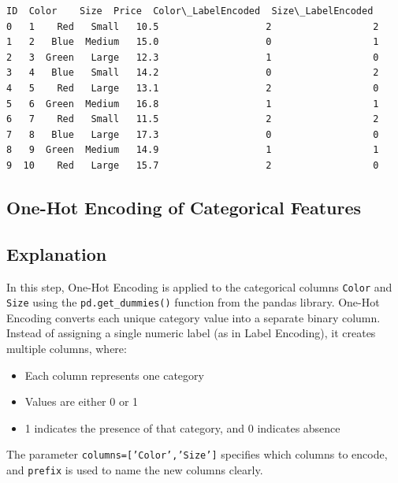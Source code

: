 \documentclass[11pt,a4paper]{report}
\makeatletter
\newcommand{\boxspacing}{\kern\kvtcb@left@rule\kern\kvtcb@boxsep}
\newcommand{\prompt}[4]{
        {\ttfamily\llap{{\color{#2}[#3]:\hspace{3pt}#4}}\vspace{-\baselineskip}}
    }
\makeatother
\begin{document}
            \begin{tcolorbox}[breakable, size=fbox, boxrule=.5pt, pad at break*=1mm, opacityfill=0]
\prompt{Out}{outcolor}{3}{\boxspacing}
\begin{Verbatim}[commandchars=\\\{\}]
   ID  Color    Size  Price  Color\_LabelEncoded  Size\_LabelEncoded
0   1    Red   Small   10.5                   2                  2
1   2   Blue  Medium   15.0                   0                  1
2   3  Green   Large   12.3                   1                  0
3   4   Blue   Small   14.2                   0                  2
4   5    Red   Large   13.1                   2                  0
5   6  Green  Medium   16.8                   1                  1
6   7    Red   Small   11.5                   2                  2
7   8   Blue   Large   17.3                   0                  0
8   9  Green  Medium   14.9                   1                  1
9  10    Red   Large   15.7                   2                  0
\end{Verbatim}
\end{tcolorbox}
        
        
\subsection{One-Hot Encoding of Categorical Features}

\subsection*{Explanation}
In this step, One-Hot Encoding is applied to the categorical columns \texttt{Color} and \texttt{Size} using the \texttt{pd.get\_dummies()} function from the pandas library. One-Hot Encoding converts each unique category value into a separate binary column. Instead of assigning a single numeric label (as in Label Encoding), it creates multiple columns, where:
\begin{itemize}
    \item Each column represents one category
    \item Values are either 0 or 1
    \item 1 indicates the presence of that category, and 0 indicates absence
\end{itemize}

The parameter \texttt{columns=['Color','Size']} specifies which columns to encode, and \texttt{prefix} is used to name the new columns clearly.
\end{document}
